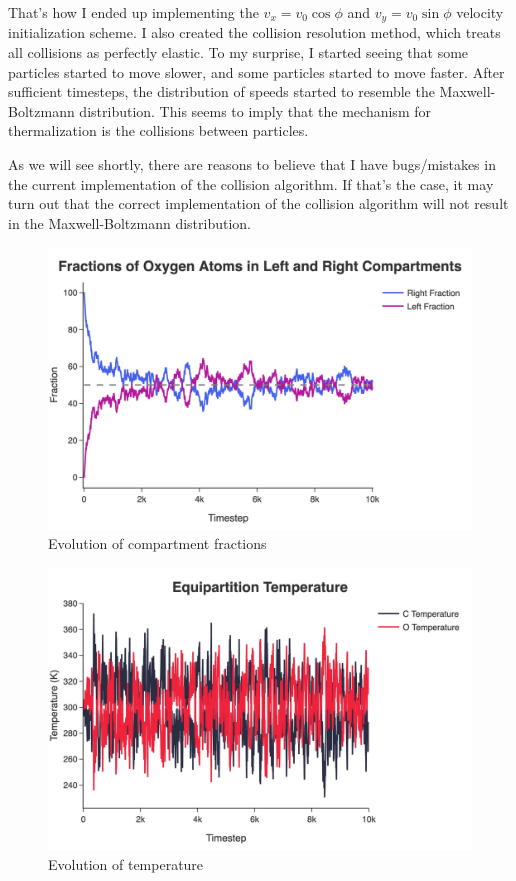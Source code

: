 \documentclass[12pt]{article}
\begin{document}
That's how I ended up implementing the $v_x=v_0 \cos\phi$ and $v_y=v_0 \sin \phi$ velocity initialization scheme. I also created the collision resolution method, which treats all collisions as perfectly elastic. To my surprise, I started seeing that some particles started to move slower, and some particles started to move faster. After sufficient timesteps, the distribution of speeds started to resemble the Maxwell-Boltzmann distribution. This seems to imply that the mechanism for thermalization is the collisions between particles.

\begin{warningbox}
    As we will see shortly, there are reasons to believe that I have bugs/mistakes in the current implementation of the collision algorithm. If that's the case, it may turn out that the correct implementation of the collision algorithm will not result in the Maxwell-Boltzmann distribution.
\end{warningbox}
\begin{figure}[ht]
    \centering
    \includegraphics[width=0.8\linewidth]{../figures/jpg/n200_m1_10k/compartment_fractions.jpg}
    \caption{Evolution of compartment fractions}
    \label{fig:compartment_fractions}
\end{figure}

\begin{figure}[h]
    \centering
    \includegraphics[width=0.8\linewidth]{../figures/jpg/n200_m1_10k/equipartition_temperature.jpg}
    \caption{Evolution of temperature}
    \label{fig:temperature}
\end{figure}
\end{document}
